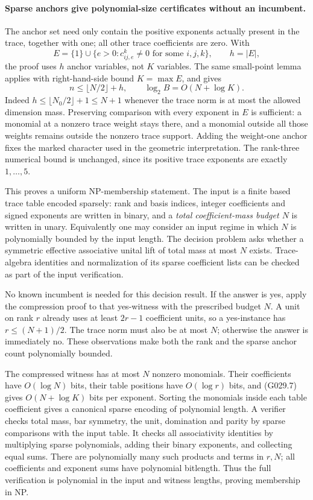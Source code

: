 \paragraph{Sparse anchors give polynomial-size certificates without an incumbent.}
The anchor set need only contain the positive exponents
actually present in the trace, together with one; all
other trace coefficients are zero. With
\[
 E=\{1\}\cup\{e>0:c_{ij,e}^k\ne0\text{ for some }i,j,k\},
 \qquad h=|E|,
\]
the proof uses $h$ anchor variables, not $K$ variables.
The same small-point lemma applies with right-hand-side
bound $K=\max E$, and gives
\[
 n\le\lfloor N/2\rfloor+h,\qquad
 \log_2 B=O(N+\log K).                              \tag{G029.7}
\]
Indeed $h\le\lfloor N_0/2\rfloor+1\le N+1$ whenever
the trace norm is at most the allowed dimension mass.
Preserving comparison with every exponent in $E$ is
sufficient: a monomial at a nonzero trace weight stays
there, and a monomial outside all those weights remains
outside the nonzero trace support. Adding the weight-one
anchor fixes the marked character used in the geometric
interpretation. The rank-three numerical bound is unchanged,
since its positive trace exponents are exactly $1,\ldots,5$.

This proves a uniform NP-membership statement. The input
is a finite based trace table encoded sparsely: rank and
basis indices, integer coefficients and signed exponents
are written in binary, and a \emph{total coefficient-mass
budget $N$} is written in unary. Equivalently one may
consider an input regime in which $N$ is polynomially
bounded by the input length. The decision problem asks
whether a symmetric effective associative unital lift
of total mass at most $N$ exists. Trace-algebra identities
and normalization of its sparse coefficient lists can
be checked as part of the input verification.

No known incumbent is needed for this decision result.
If the answer is yes, apply the compression proof to
that yes-witness with the prescribed budget $N$.
A unit on rank $r$ already uses at least $2r-1$ coefficient
units, so a yes-instance has $r\le(N+1)/2$. The trace
norm must also be at most $N$; otherwise the answer is
immediately no. These observations make both the rank
and the sparse anchor count polynomially bounded.

The compressed witness has at most $N$ nonzero monomials.
Their coefficients have $O(\log N)$ bits, their table
positions have $O(\log r)$ bits, and (G029.7) gives
$O(N+\log K)$ bits per exponent. Sorting the monomials
inside each table coefficient gives a canonical sparse
encoding of polynomial length. A verifier checks total
mass, bar symmetry, the unit, domination and parity by
sparse comparisons with the input table. It checks all
associativity identities by multiplying sparse polynomials,
adding their binary exponents, and collecting equal sums.
There are polynomially many such products and terms in
$r,N$; all coefficients and exponent sums have polynomial
bitlength. Thus the full verification is polynomial in
the input and witness lengths, proving membership in NP.

